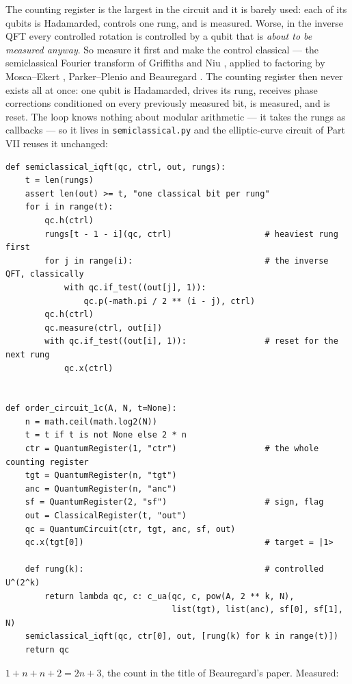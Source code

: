 \documentclass[11pt]{article}
\newcommand{\code}[1]{\texttt{#1}}
\theoremstyle{plain}
\theoremstyle{remark}
\begin{document}
The counting register is the largest in the circuit and it is barely used: each of its qubits is
Hadamarded, controls one rung, and is measured. Worse, in the inverse QFT every controlled rotation
is controlled by a qubit that is \emph{about to be measured anyway}. So measure it first and make
the control classical --- the semiclassical Fourier transform of Griffiths and Niu
\cite{griffiths-niu}, applied to factoring by Mosca--Ekert \cite{mosca-ekert}, Parker--Plenio
\cite{parker-plenio} and Beauregard \cite{beauregard}. The counting register then never exists all
at once: one qubit is Hadamarded, drives its rung, receives phase corrections conditioned on every
previously measured bit, is measured, and is reset. The loop knows nothing about modular arithmetic
--- it takes the rungs as callbacks --- so it lives in \code{semiclassical.py} and the
elliptic-curve circuit of Part VII reuses it unchanged:

\begin{lstlisting}
def semiclassical_iqft(qc, ctrl, out, rungs):
    t = len(rungs)
    assert len(out) >= t, "one classical bit per rung"
    for i in range(t):
        qc.h(ctrl)
        rungs[t - 1 - i](qc, ctrl)                   # heaviest rung first
        for j in range(i):                           # the inverse QFT, classically
            with qc.if_test((out[j], 1)):
                qc.p(-math.pi / 2 ** (i - j), ctrl)
        qc.h(ctrl)
        qc.measure(ctrl, out[i])
        with qc.if_test((out[i], 1)):                # reset for the next rung
            qc.x(ctrl)


def order_circuit_1c(A, N, t=None):
    n = math.ceil(math.log2(N))
    t = t if t is not None else 2 * n
    ctr = QuantumRegister(1, "ctr")                  # the whole counting register
    tgt = QuantumRegister(n, "tgt")
    anc = QuantumRegister(n, "anc")
    sf = QuantumRegister(2, "sf")                    # sign, flag
    out = ClassicalRegister(t, "out")
    qc = QuantumCircuit(ctr, tgt, anc, sf, out)
    qc.x(tgt[0])                                     # target = |1>

    def rung(k):                                     # controlled U^(2^k)
        return lambda qc, c: c_ua(qc, c, pow(A, 2 ** k, N),
                                  list(tgt), list(anc), sf[0], sf[1], N)
    semiclassical_iqft(qc, ctr[0], out, [rung(k) for k in range(t)])
    return qc
\end{lstlisting}

\noindent
$1+n+n+2=2n+3$, the count in the title of Beauregard's paper. Measured:
\end{document}
